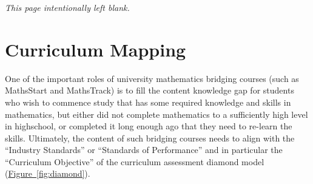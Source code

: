 \documentclass[twoside,12pt,a4paper]{report}
\makeatletter
\newcommand*{\intentionallyblankpage}{
  \vspace*{\fill}
  {\centering \textit{This page intentionally left blank.} \par}
  \vspace{\fill}}
\renewcommand*{\cleardoublepage}{\clearpage\if@twoside \ifodd\c@page\else
  \intentionallyblankpage
  \newpage
  \if@twocolumn\hbox{}\newpage\fi\fi\fi}
\newcommand{\reffig}[1]{\hyperref[fig:#1]{Figure~\ref{fig:#1}}}
\makeatother
\begin{document}
\cleardoublepage
\chapter{Curriculum Mapping}
\label{chap:curriculum}


One of the important roles of university mathematics bridging courses (such as MathsStart and MathsTrack) is to fill the content knowledge gap for students who  wish to commence study that has some required knowledge and skills in mathematics, but either did not complete mathematics to a sufficiently high level in highschool, or completed it long enough ago that they need to re-learn the skills. Ultimately, the content of such bridging courses needs to align with the ``Industry Standards'' or ``Standards of Performance'' and in particular the ``Curriculum Objective'' of the curriculum assessment diamond model (\reffig{diamond}). 
\end{document}

